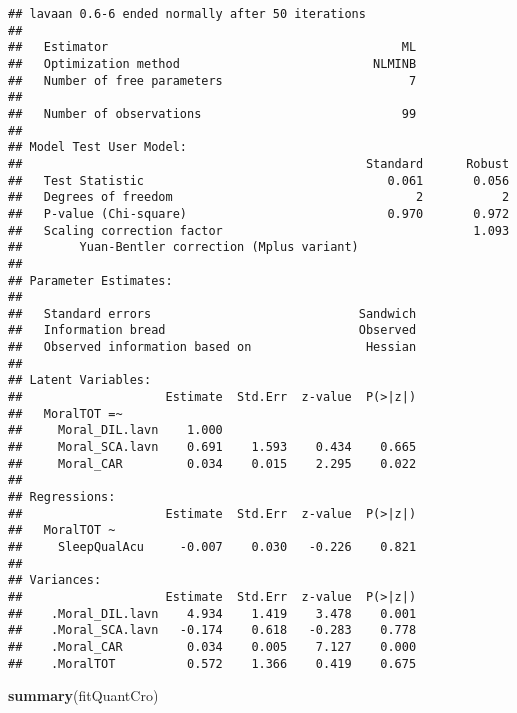 \documentclass[
]{book}
\newenvironment{Shaded}{\begin{snugshade}}{\end{snugshade}}
\newcommand{\KeywordTok}[1]{\textcolor[rgb]{0.13,0.29,0.53}{\textbf{#1}}}
\newcommand{\NormalTok}[1]{#1}
\begin{document}
\begin{verbatim}
## lavaan 0.6-6 ended normally after 50 iterations
## 
##   Estimator                                         ML
##   Optimization method                           NLMINB
##   Number of free parameters                          7
##                                                       
##   Number of observations                            99
##                                                       
## Model Test User Model:
##                                                Standard      Robust
##   Test Statistic                                  0.061       0.056
##   Degrees of freedom                                  2           2
##   P-value (Chi-square)                            0.970       0.972
##   Scaling correction factor                                   1.093
##        Yuan-Bentler correction (Mplus variant)                     
## 
## Parameter Estimates:
## 
##   Standard errors                             Sandwich
##   Information bread                           Observed
##   Observed information based on                Hessian
## 
## Latent Variables:
##                    Estimate  Std.Err  z-value  P(>|z|)
##   MoralTOT =~                                         
##     Moral_DIL.lavn    1.000                           
##     Moral_SCA.lavn    0.691    1.593    0.434    0.665
##     Moral_CAR         0.034    0.015    2.295    0.022
## 
## Regressions:
##                    Estimate  Std.Err  z-value  P(>|z|)
##   MoralTOT ~                                          
##     SleepQualAcu     -0.007    0.030   -0.226    0.821
## 
## Variances:
##                    Estimate  Std.Err  z-value  P(>|z|)
##    .Moral_DIL.lavn    4.934    1.419    3.478    0.001
##    .Moral_SCA.lavn   -0.174    0.618   -0.283    0.778
##    .Moral_CAR         0.034    0.005    7.127    0.000
##    .MoralTOT          0.572    1.366    0.419    0.675
\end{verbatim}

\begin{Shaded}
\begin{Highlighting}[]
\KeywordTok{summary}\NormalTok{(fitQuantCro)}
\end{Highlighting}
\end{Shaded}
\end{document}
